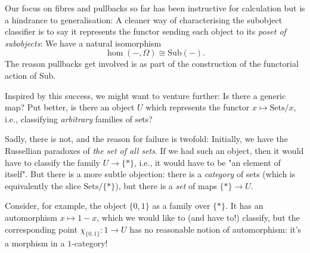 \begin{node}
%
Our focus on fibres and pullbacks so far has been instructive for
calculation but is a hindrance to generalisation: A cleaner way of
characterising the subobject classifier is to say it represents the
functor sending each object to its \emph{poset of subobjects}: We have a
natural isomorphism
\[
  \hom(-, \Omega) \cong \mathrm{Sub}(-).
\]
The reason pullbacks get involved is as part of the construction of the
functorial action of \(\mathrm{Sub}\).
%
\end{node}

\begin{node}
%
Inspired by this success, we might want to venture further: Is there a
generic map? Put better, is there an object \(U\) which represents the
functor \(x \mapsto \mathrm{Sets}/x\), i.e., classifying
\emph{arbitrary} families of sets?

Sadly, there is not, and the reason for failure is twofold: Initially,
we have the Russellian paradoxes of \emph{the set of all sets}. If we
had such an object, then it would have to classify the family \(U \to
\{*\}\), i.e., it would have to be "an element of itself". But there is
a more subtle objection: there is a \emph{category} of sets (which is
equivalently the slice \(\mathrm{Sets}/\{*\}\)), but there is a
\emph{set} of maps \(\{*\} \to U\).

Consider, for example, the object \(\{0,1\}\) as a family over
\(\{*\}\). It has an automorphism \(x \mapsto 1 - x\), which we would
like to (and have to!) classify, but the corresponding point
\(\chi_{\{0,1\}} : 1 \to U\) has no reasonable notion of automorphism:
it's a morphism in a \(1\)-category!
%
\end{node}
